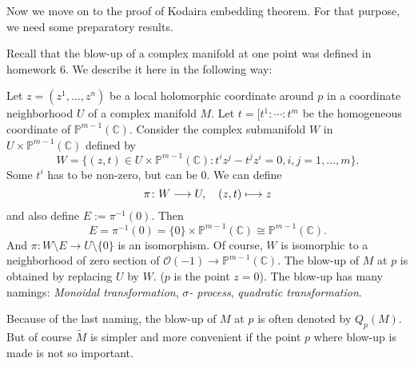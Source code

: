 \documentclass[12pt]{article}
\begin{document}
Now we move on to the proof of Kodaira embedding theorem. For that purpose,
we need some preparatory results.

Recall that the blow-up of a complex manifold at one point was defined in
homework 6. We describe it here in the following way:

Let \(z=(z^1,\ldots,z^n)\) be a local holomorphic coordinate around \(p\) in
a coordinate neighborhood \(U\) of a complex manifold \(M\). Let \(t=[t^1:\cdots
:t^m\) be the homogeneous coordinate of \(\mathbb{P}^{m-1}(\mathbb{C})\).
Consider the complex submanifold \(W\) in \(U\times\mathbb{P}^{m-1}(\mathbb{C})\)
defined by \[
  W=\{(z,t)\in U\times \mathbb{P}^{m-1}(\mathbb{C}):t^i z^j-t^j z^i=0,
  i,j=1,\ldots,m\}
.\] Some \(t^i\) has to be non-zero, but can be 0. We can define \[
  \pi\colon W\longrightarrow U,\quad(z,t)\longmapsto z
\] and also define \(E:=\pi^{-1}(0)\). Then \[
  E=\pi^{-1}(0)=\{0\}\times \mathbb{P}^{m-1}(\mathbb{C})
  \cong\mathbb{P}^{m-1}(\mathbb{C})
.\] And \(\pi\colon W\setminus E\to U\setminus\{0\}\) is an isomorphism.
Of course, \(W\) is isomorphic to a neighborhood of zero section of
\(\mathcal{O}(-1)\to \mathbb{P}^{m-1}(\mathbb{C})\). The blow-up of \(M\) at
\(p\) is obtained by replacing \(U\) by \(W\). (\(p\) is the point \(z=0\)).
The blow-up has many namings: \emph{Monoidal transformation}, \emph{\(\sigma\)-
process}, \emph{quadratic transformation}.

Because of the last naming, the blow-up of \(M\) at \(p\) is often denoted by
\(Q_p(M)\). But of course \(\tilde{M}\) is simpler and more convenient if the
point \(p\) where blow-up is made is not so important.
\end{document}
